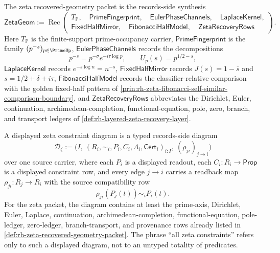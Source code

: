 \begin{definition}
\label{def:rh-zeta-recovered-geometry-packet}
The zeta recovered-geometry packet is the records-side synthesis
$$
\mathsf{ZetaGeom}
:=
\operatorname{Rec}
\left(
\begin{gathered}
T_{\mathbb P},\quad
\mathsf{PrimeFingerprint},\quad
\mathsf{EulerPhaseChannels},\quad
\mathsf{LaplaceKernel},\\
\mathsf{FixedHalfMirror},\quad
\mathsf{FibonacciHalfModel},\quad
\mathsf{ZetaRecoveryRows}
\end{gathered}
\right).
$$
Here $T_{\mathbb P}$ is the finite-support prime-occupancy carrier,
$\mathsf{PrimeFingerprint}$ is the family $(p^{-s})_{p\in\PrimeUp}$,
$\mathsf{EulerPhaseChannels}$ records the decompositions
$$
p^{-s}=p^{-\sigma}e^{-i\tau\log p},
\qquad
U_p(s)=p^{1/2-s},
$$
$\mathsf{LaplaceKernel}$ records $e^{-s\log n}=n^{-s}$,
$\mathsf{FixedHalfMirror}$ records $J(s)=1-\overline{s}$ and
$s=1/2+\delta+i\tau$, $\mathsf{FibonacciHalfModel}$ records the
classifier-relative comparison with the golden fixed-half pattern of
\autoref{prin:rh-zeta-fibonacci-self-similar-comparison-boundary}, and
$\mathsf{ZetaRecoveryRows}$ abbreviates the Dirichlet, Euler,
continuation, archimedean-completion, functional-equation, pole, zero,
branch, and transport ledgers of \autoref{def:rh-layered-zeta-recovery-layer}.
\end{definition}

\begin{definition}
\label{def:rh-displayed-zeta-constraint-diagram}
A displayed zeta constraint diagram is a typed records-side diagram
$$
\mathcal D_{\zeta}
:=
\bigl(I,\ (R_i,\sim_i,P_i,C_i,\Lambda_i,\mathsf{Cert}_i)_{i:I},\
(\rho_{ji})_{j\to i}\bigr)
$$
over one source carrier, where each $P_i$ is a displayed readout, each
$C_i:R_i\to\mathsf{Prop}$ is a displayed constraint row, and every edge
$j\to i$ carries a readback map $\rho_{ji}:R_j\to R_i$ with the source
compatibility row
$$
\rho_{ji}(P_j(t))\sim_i P_i(t).
$$
For the zeta packet, the diagram contains at least the prime-axis,
Dirichlet, Euler, Laplace, continuation, archimedean-completion,
functional-equation, pole-ledger, zero-ledger, branch-transport, and
provenance rows already listed in
\autoref{def:rh-zeta-recovered-geometry-packet}. The phrase ``all zeta
constraints'' refers only to such a displayed diagram, not to an
untyped totality of predicates.
\end{definition}


